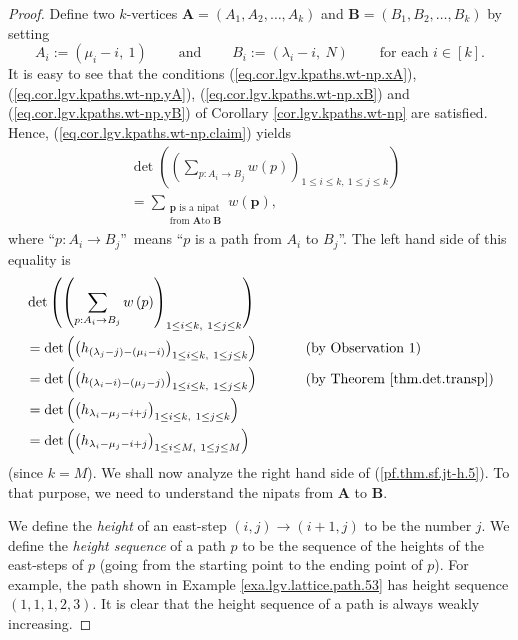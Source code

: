 \begin{proof}
Define two $k$-vertices $\mathbf{A}=\left(  A_{1},A_{2},\ldots,A_{k}\right)  $
and $\mathbf{B}=\left(  B_{1},B_{2},\ldots,B_{k}\right)  $ by setting%
\[
A_{i}:=\left(  \mu_{i}-i,\ 1\right)  \ \ \ \ \ \ \ \ \ \ \text{and}%
\ \ \ \ \ \ \ \ \ \ B_{i}:=\left(  \lambda_{i}-i,\ N\right)
\ \ \ \ \ \ \ \ \ \ \text{for each }i\in\left[  k\right]  .
\]
It is easy to see that the conditions (\ref{eq.cor.lgv.kpaths.wt-np.xA}),
(\ref{eq.cor.lgv.kpaths.wt-np.yA}), (\ref{eq.cor.lgv.kpaths.wt-np.xB}) and
(\ref{eq.cor.lgv.kpaths.wt-np.yB}) of Corollary \ref{cor.lgv.kpaths.wt-np} are
satisfied. Hence, (\ref{eq.cor.lgv.kpaths.wt-np.claim}) yields%
\begin{align}
&  \det\left(  \left(  \sum_{p:A_{i}\rightarrow B_{j}}w\left(  p\right)
\right)  _{1\leq i\leq k,\ 1\leq j\leq k}\right) \nonumber\\
&  =\sum_{\substack{\mathbf{p}\text{ is a nipat}\\\text{from }\mathbf{A}\text{
to }\mathbf{B}}}w\left(  \mathbf{p}\right)  , \label{pf.thm.sf.jt-h.5}%
\end{align}
where \textquotedblleft$p:A_{i}\rightarrow B_{j}$\textquotedblright\ means
\textquotedblleft$p$ is a path from $A_{i}$ to $B_{j}$\textquotedblright. The
left hand side of this equality is%
\begin{align}
&  \det\left(  \left(  \sum_{p:A_{i}\rightarrow B_{j}}w\left(  p\right)
\right)  _{1\leq i\leq k,\ 1\leq j\leq k}\right) \nonumber\\
&  =\det\left(  \left(  h_{\left(  \lambda_{j}-j\right)  -\left(  \mu
_{i}-i\right)  }\right)  _{1\leq i\leq k,\ 1\leq j\leq k}\right)
\ \ \ \ \ \ \ \ \ \ \left(  \text{by Observation 1}\right) \nonumber\\
&  =\det\left(  \left(  h_{\left(  \lambda_{i}-i\right)  -\left(  \mu
_{j}-j\right)  }\right)  _{1\leq i\leq k,\ 1\leq j\leq k}\right)
\ \ \ \ \ \ \ \ \ \ \left(  \text{by Theorem \ref{thm.det.transp}}\right)
\nonumber\\
&  =\det\left(  \left(  h_{\lambda_{i}-\mu_{j}-i+j}\right)  _{1\leq i\leq
k,\ 1\leq j\leq k}\right) \nonumber\\
&  =\det\left(  \left(  h_{\lambda_{i}-\mu_{j}-i+j}\right)  _{1\leq i\leq
M,\ 1\leq j\leq M}\right)  \label{pf.thm.sf.jt-h.6}%
\end{align}
(since $k=M$). We shall now analyze the right hand side of
(\ref{pf.thm.sf.jt-h.5}). To that purpose, we need to understand the nipats
from $\mathbf{A}$ to $\mathbf{B}$.

We define the \emph{height} of an east-step $\left(  i,j\right)
\rightarrow\left(  i+1,j\right)  $ to be the number $j$. We define the
\emph{height sequence} of a path $p$ to be the sequence of the heights of the
east-steps of $p$ (going from the starting point to the ending point of $p$).
For example, the path shown in Example \ref{exa.lgv.lattice.path.53} has
height sequence $\left(  1,1,1,2,3\right)  $. It is clear that the height
sequence of a path is always weakly increasing.


\end{proof}
